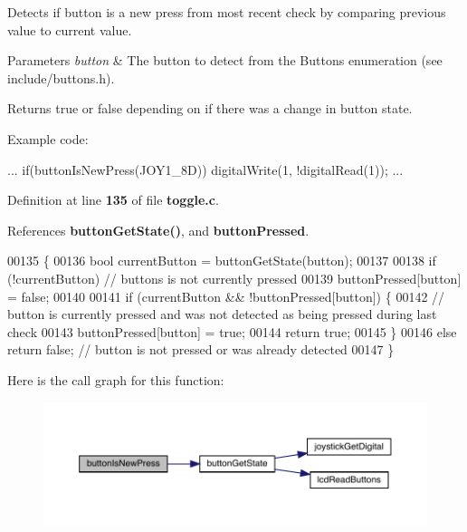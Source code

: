 Detects if button is a new press from most recent check by comparing previous value to current value. 


\begin{DoxyParams}{Parameters}
{\em button} & The button to detect from the Buttons enumeration (see include/buttons.\+h).\\
\hline
\end{DoxyParams}
\begin{DoxyReturn}{Returns}
true or false depending on if there was a change in button state.
\end{DoxyReturn}
Example code\+: 
\begin{DoxyCode}
...
if(buttonIsNewPress(JOY1_8D))
    digitalWrite(1, !digitalRead(1));
...
\end{DoxyCode}
 

Definition at line \textbf{ 135} of file \textbf{ toggle.\+c}.



References \textbf{ button\+Get\+State()}, and \textbf{ button\+Pressed}.


\begin{DoxyCode}
00135                                        \{
00136     \textcolor{keywordtype}{bool} currentButton = buttonGetState(button);
00137 
00138     \textcolor{keywordflow}{if} (!currentButton) \textcolor{comment}{// buttons is not currently pressed}
00139         buttonPressed[button] = \textcolor{keyword}{false};
00140 
00141     \textcolor{keywordflow}{if} (currentButton && !buttonPressed[button]) \{
00142         \textcolor{comment}{// button is currently pressed and was not detected as being pressed during last check}
00143         buttonPressed[button] = \textcolor{keyword}{true};
00144         \textcolor{keywordflow}{return} \textcolor{keyword}{true};
00145     \}
00146     \textcolor{keywordflow}{else} \textcolor{keywordflow}{return} \textcolor{keyword}{false}; \textcolor{comment}{// button is not pressed or was already detected}
00147 \}
\end{DoxyCode}
Here is the call graph for this function\+:\nopagebreak
\begin{figure}[H]
\begin{center}
\leavevmode
\includegraphics[width=350pt]{toggle_8c_a07c56bf50097f5bf35c5e8c9067800e1_cgraph}
\end{center}
\end{figure}


